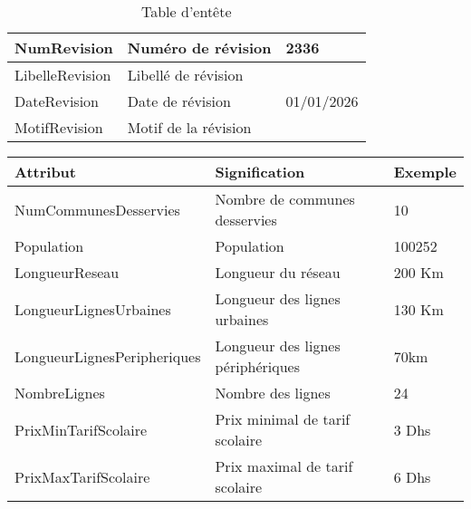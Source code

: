 \begin{table}[H]
\begin{center}
\begin{tabularx}{17.5cm}{|p{3.5cm}|X|p{3.5cm}|}
				\hline
				NumRevision          & Numéro de révision                                            & 2336                \\
				\hline
				LibelleRevision      & Libellé de révision                                           &                     \\
				\hline
				DateRevision         & Date de révision                                              & 01/01/2026          \\
				\hline
				MotifRevision        & Motif de la révision                                          &                     \\
				\hline
			\end{tabularx}
			\caption{Table d'entête}
		\end{center}
	\end{table}
	\begin{table}[H]
		\begin{center}
			\begin{tabularx}{17.5cm}{|p{6.5cm}|X|p{2.1cm}|}
				\hline
				\textbf{Attribut}                    & \textbf{Signification}                                       & \textbf{Exemple} \\
				\hline
				NumCommunesDesservies                & Nombre de communes desservies                                & 10               \\
				\hline
				Population                           & Population                                                   & 100252           \\
				\hline
				LongueurReseau                       & Longueur du réseau                                           & 200 Km           \\
				\hline
				LongueurLignesUrbaines               & Longueur des lignes urbaines                                 & 130 Km           \\
				\hline
				LongueurLignesPeripheriques          & Longueur des lignes périphériques                            & 70km             \\
				\hline
				NombreLignes                         & Nombre des lignes                                            & 24               \\
				\hline
				PrixMinTarifScolaire                 & Prix minimal de tarif scolaire                               & 3 Dhs            \\
				\hline
				PrixMaxTarifScolaire                 & Prix maximal de tarif scolaire                               & 6 Dhs            \\

\end{tabularx}
\end{center}
\end{table}
